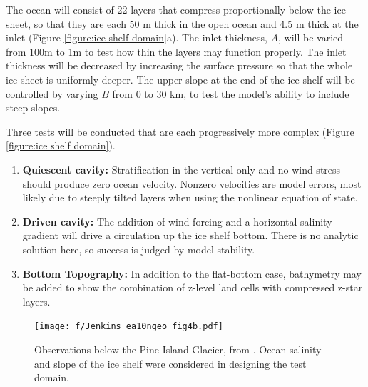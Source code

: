 \documentclass[11pt]{report}
\begin{document}
The ocean will consist of 22 layers that compress proportionally below the ice sheet, so that they are each 50 m thick in the open ocean and 4.5 m thick at the inlet (Figure \ref{figure:ice shelf domain}a).  The inlet thickness, $A$, will be varied from 100m to 1m to test how thin the layers may function properly.  The inlet thickness will be decreased by increasing the surface pressure so that the whole ice sheet is uniformly deeper.  The upper slope at the end of the ice shelf will be controlled by varying $B$ from 0 to 30 km, to test the model's ability to include steep slopes.

Three tests will be conducted that are each progressively more complex (Figure \ref{figure:ice shelf domain}).
\begin{enumerate}
\item {\bf Quiescent cavity:} Stratification in the vertical only and no wind stress should produce zero ocean velocity.  Nonzero velocities are model errors, most likely due to steeply tilted layers when using the nonlinear equation of state.
\item {\bf Driven cavity:} The addition of wind forcing and a horizontal salinity gradient will drive a circulation up the ice shelf bottom.  There is no analytic solution here, so success is judged by model stability.
\item {\bf Bottom Topography:} In addition to the flat-bottom case, bathymetry may be added to show the combination of z-level land cells with compressed z-star layers.
\end{enumerate}

\begin{figure}[tbh]
\center
\texttt{[image: f/Jenkins\_ea10ngeo\_fig4b.pdf]}
\caption{Observations below the Pine Island Glacier, from \citet{Jenkins_ea10ngeo}.  Ocean salinity and slope of the ice shelf were considered in designing the test domain.}
\label{figure:pig observations}
\end{figure}
\end{document}
